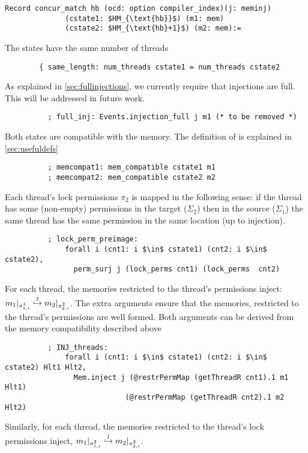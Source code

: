 \begin{lstlisting}[firstnumber=1]
      Record concur_match hb (ocd: option compiler_index)(j: meminj)
              (cstate1: $HM_{\text{hb}}$) (m1: mem) 
              (cstate2: $HM_{\text{hb}+1}$) (m2: mem):=
\end{lstlisting}     
\noindent The states have the same number of threads
\begin{lstlisting}
        { same_length: num_threads cstate1 = num_threads cstate2
\end{lstlisting}     
\noindent As explained in \cref{sec:fullinjections}, we currently require that injections are full. This will be addressed in future work.
\begin{lstlisting}
          ; full_inj: Events.injection_full j m1 (* to be removed *)
\end{lstlisting}     
\noindent Both states are compatible with the memory. The definition of  is explained in \cref{sec:usefuldefs}
\begin{lstlisting}
          ; memcompat1: mem_compatible cstate1 m1
          ; memcompat2: mem_compatible cstate2 m2
\end{lstlisting}     
\noindent Each thread's lock permissions $\pi_2$ is mapped in the following sense: if the thread has some (non-empty) permissions in the target ($\Sigma_2$) then in the source ($\Sigma_1$) the same thread has the same permission in the same location (up to injection).
\begin{lstlisting}
          ; lock_perm_preimage:
              forall i (cnt1: i $\in$ cstate1) (cnt2: i $\in$  cstate2),
                perm_surj j (lock_perms cnt1) (lock_perms  cnt2)
\end{lstlisting}     
\noindent For each thread, the memories restricted to the thread's permissions inject: $m_1 |_{\pi^1_{1,i}} \overset{j}{\hookrightarrow} m_2 |_{\pi^2_{2,i}}$. The extra arguments  ensure that the memories, restricted to the thread's permissions are well formed. Both arguments can be derived from the memory compatibility described above 
\begin{lstlisting}
          ; INJ_threads:
              forall i (cnt1: i $\in$ cstate1) (cnt2: i $\in$  cstate2) Hlt1 Hlt2,
                Mem.inject j (@restrPermMap (getThreadR cnt1).1 m1 Hlt1)
                            (@restrPermMap (getThreadR cnt2).1 m2 Hlt2)
\end{lstlisting}     
\noindent Similarly, for each thread, the memories restricted to the thread's lock permissions inject, $m_1 |_{\pi^2_{1,i}} \overset{j}{\hookrightarrow} m_2 |_{\pi^2_{2,i}}$. 
